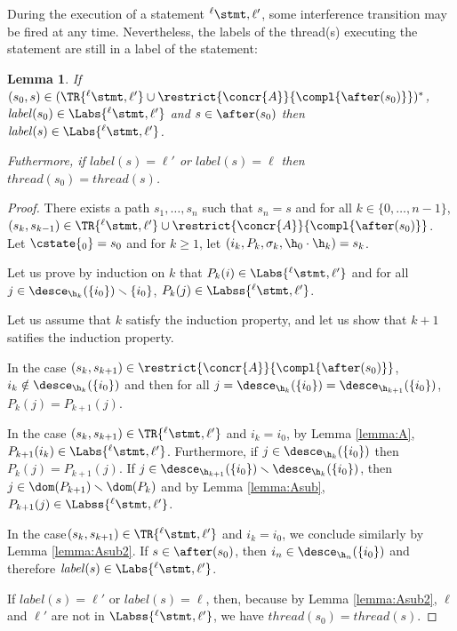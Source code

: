 \documentclass[12pt]{article}
\let\firstunion\cup
\let\cup\firstunion
\newcommand{\lab}{  {}^{\ell}}
\newcounter{labels}[figure]
\newcommand{\lbl}{\mathit{label}}
\newcommand{\thread}{\mathit{thread}}
\newtheorem{lemma}{Lemma}
\begin{document}
During the execution of a statement \(\lab\stmt,\ell'\), some interference transition may be fired at any time.
Nevertheless, the labels of the thread(s) executing the statement are still in a label of the statement:
\begin{lemma}
 \label{lemma:F}
 If \((s_0,s)\in (\TR{\lab\stmt,\ell'}\cup\restrict{\concr{A}}{\compl{\after(s_0)}})^{\ast}\), \(\lbl(s_0)\in\Labs{\lab\stmt,\ell'}\) and \(s\in\after(s_0)\) then \(\lbl(s)\in \Labs{\lab\stmt,\ell'}\).
 
 Futhermore, if \(\lbl(s)=\ell'\) or \(\lbl(s)=\ell\) then \(\thread(s_0)=\thread(s)\).
\end{lemma}
\begin{proof}
  There exists a path \(s_1,\ldots,s_n\) such that \(s_n=s\) and for all \(k\in\{0,\ldots,n-1\}\), \((s_k,s_{k-1})\in \TR{\lab\stmt,\ell'}\cup\restrict{\concr{A}}{\compl{\after(s_0)}}\).
 Let \(\cstate{_0}=s_0\) and for  \(k\geqslant 1\),
 let \((i_k,P_k,\m_k,\h_0\cdot\h_k)=s_k\). 
 
 Let us prove by induction on \(k\) that \(P_{k}(i)\in\Labs{\lab\stmt,\ell'}\) and for all \(j\in\desce_{\h_k}(\{i_0\})\smallsetminus\{i_0\}\), \(P_{k}(j)\in\Labss{\lab\stmt,\ell'}\).
 
 Let us assume that \(k\) satisfy the induction property, and let us show that \(k+1\) satifies the induction property.
 
 In the case \((s_k,s_{k+1})\in\restrict{\concr{A}}{\compl{\after(s_0)}}\), \(i_k\notin\desce_{\h_k}(\{i_0\})\) and then for all \(j=\desce_{\h_k}(\{i_0\})=\desce_{\h_{k+1}}(\{i_0\})\), \(P_k(j)=P_{k+1}(j)\).
 
 In the case \((s_k,s_{k+1})\in\TR{\lab\stmt,\ell'}\) and \(i_k=i_0\), by Lemma \ref{lemma:A},  \(P_{k+1}(i_k)\in\Labs{\lab\stmt,\ell'}\). Furthermore, if \(j\in\desce_{\h_k}(\{i_0\}) \) then \(P_k(j)=P_{k+1}(j)\).
 If \(j\in\desce_{\h_{k+1}}(\{i_0\})\smallsetminus\desce_{\h_k}(\{i_0\})\), then \(j\in\dom(P_{k+1})\smallsetminus\dom(P_k)\) and by Lemma \ref{lemma:Asub}, \(P_{k+1}(j)\in \Labss{\lab\stmt,\ell'}\).
 
 In the case\((s_k,s_{k+1})\in\TR{\lab\stmt,\ell'}\) and \(i_k=i_0\), we conclude similarly by Lemma \ref{lemma:Asub2}.
If \(s\in\after(s_0)\), then \(i_n\in\desce_{\h_n}(\{i_0\})\) and therefore \(\lbl(s)\in \Labs{\lab\stmt,\ell'}\).

If \(\lbl(s)=\ell'\) or \(\lbl(s)=\ell\), then, because by Lemma \ref{lemma:Asub2}, \(\ell\) and \(\ell'\) are not in \(\Labss{\lab \stmt,\ell'}\), we have \(\thread(s_0)=\thread(s)\).
\end{proof}
\end{document}
